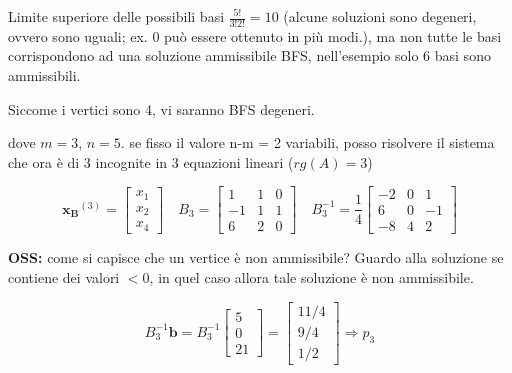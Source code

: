 \documentclass[a4paper, 11pt]{article}
\begin{document}
               

                Limite superiore delle possibili basi $\frac{5!}{3!2!} = 10$ (alcune soluzioni sono degeneri, ovvero sono uguali; ex. 0 può essere ottenuto in più modi.), ma non tutte le basi corrispondono ad una soluzione ammissibile BFS, nell’esempio solo 6 basi sono ammissibili.

                Siccome i vertici sono 4, vi saranno BFS degeneri.

                dove $m = 3$, $n = 5$. 
                se fisso il valore n-m = 2 variabili, posso risolvere il sistema che ora è  di 3 incognite in 3 equazioni lineari ($rg(A) = 3$)
                


                \[
                    \mathbf{x_B}^{(3)} =
                    \begin{bmatrix}
                        x_1 \\ x_2 \\x_4
                    \end{bmatrix}
                    \quad
                    B_3 =
                    \begin{bmatrix}
                        1 & 1 & 0 \\
                        -1 & 1 & 1 \\
                        6 & 2 & 0
                    \end{bmatrix}
                    \quad
                    B_3^{-1} =
                    \frac{1}{4}
                    \begin{bmatrix}
                        -2 & 0 & 1 \\
                        6 & 0 & -1 \\
                        -8 & 4 & 2
                    \end{bmatrix}
                \]
                    
                    

                \textbf{OSS: } come si capisce che un vertice è non ammissibile? Guardo alla soluzione se contiene dei valori $< 0$, in quel caso allora tale soluzione è non ammissibile.
                
                
                
                \[
                    B_3^{-1} \mathbf{b} =
                    B_3^{-1}
                    \begin{bmatrix}
                        5 \\ 0 \\ 21
                    \end{bmatrix}
                    =
                    \begin{bmatrix}
                        11/4 \\
                        9/4 \\
                        1/2
                    \end{bmatrix}
                    \Rightarrow p_3
                \]
\end{document}
